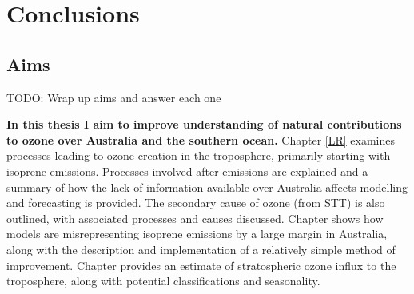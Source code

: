 \chapter{Conclusions} %
\label{Conclusions}


\section{Aims}
\label{Conclusions:aims}

  TODO: Wrap up aims and answer each one
  
  \textbf{In this thesis I aim to improve understanding of natural contributions to ozone over Australia and the southern ocean.}
  Chapter \ref{LR} examines processes leading to ozone creation in the troposphere, primarily starting with isoprene emissions.
  Processes involved after emissions are explained and a summary of how the lack of information available over Australia affects modelling and forecasting is provided.
  The secondary cause of ozone (from STT) is also outlined, with associated processes and causes discussed.
  Chapter  shows how models are misrepresenting isoprene emissions by a large margin in Australia, along with the description and implementation of a relatively simple method of improvement.
  Chapter  provides an estimate of stratospheric ozone influx to the troposphere, along with potential classifications and seasonality.
  
  
  
